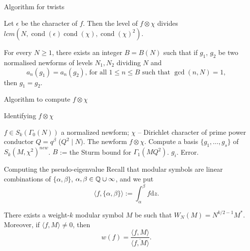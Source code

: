 \documentclass[handout]{beamer}
\DeclareMathOperator{\cond}{cond}
\begin{document}
\begin{frame}{Algorithm for twists}

\begin{Lemma}
Let $\epsilon$ be the character of $f$. Then the level of $f \otimes \chi$ divides $lcm(N, \cond(\epsilon) \cond(\chi), \cond(\chi)^2)$. 
\end{Lemma}

\begin{Lemma}
For every $N \geq 1$, there exists an integer $B = B(N)$ such that if $g_1$, $g_2$ be two normalised newforms of levels $N_1,N_2$ dividing $N$ and 
\[
	a_n(g_1) = a_n(g_2), \, \mbox{for all }1 \leq n \leq B \mbox{ such that } \gcd(n,N) = 1,
\]
then $g_1 = g_2$.
\end{Lemma}

\end{frame}

\begin{frame}{Algorithm to compute $f \otimes \chi$}
\begin{algorithm}[H]
\caption{Identifying  $f \otimes \chi$}
\label{alg: twist}
\begin{algorithmic}
    \Require $f \in S_k(\Gamma_0(N))$ a normalized newform; 
     $\chi$ -- Dirichlet character of prime power conductor $Q = q^\beta$ ($Q^2 \mid N$). 
    \Ensure The newform $f \otimes \chi$. 
	\State Compute a basis $\{g_1, \ldots, g_s\}$ of $S_k(M, \chi^2)^{new}$. 
    	\State $B$ := the Sturm bound for $\Gamma_1(MQ^2)$. 
			\State \Return $g_i$.
		\EndIf
	\EndFor
   \EndFor
   \State \Return Error.
\end{algorithmic}
\end{algorithm}
\end{frame}

\begin{frame}{Computing the pseudo-eigenvalue}
Recall that modular symbols are linear combinations of $\{\alpha, \beta\}$, $\alpha, \beta \in \mathbb{Q} \cup \infty$, 
and we put 
\[
	\langle f, \{\alpha, \beta\} \rangle := \int_{\alpha}^{\beta} f \textrm{d} z. 
\]
\begin{Lemma}[C.]
There exists a weight-$k$ modular symbol $M$ be such that $W_N(M) = N^{k/2 -1} M^*$. Moreover, if $\langle f, M \rangle \neq 0$, then 
\[
	w(f) = \frac{\langle f,M \rangle }{\overline{\langle f,M \rangle}}.
\]
\end{Lemma} 

\end{frame}
\end{document}
